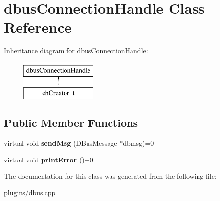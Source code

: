 \hypertarget{classdbusConnectionHandle}{\section{dbus\-Connection\-Handle \-Class \-Reference}
\label{classdbusConnectionHandle}
}
\-Inheritance diagram for dbus\-Connection\-Handle\-:\begin{figure}[H]
\begin{center}
\leavevmode
\includegraphics[height=2.000000cm]{classdbusConnectionHandle}
\end{center}
\end{figure}
\subsection*{\-Public \-Member \-Functions}
\begin{DoxyCompactItemize}
\item 
\hypertarget{classdbusConnectionHandle_af5227c7912ec21c4c4038bfa379c4a6f}{virtual void {\bfseries send\-Msg} (\-D\-Bus\-Message $\ast$dbmsg)=0}\label{classdbusConnectionHandle_af5227c7912ec21c4c4038bfa379c4a6f}

\item 
\hypertarget{classdbusConnectionHandle_a91d40d8dafa19f3ef45c360626725487}{virtual void {\bfseries print\-Error} ()=0}\label{classdbusConnectionHandle_a91d40d8dafa19f3ef45c360626725487}

\end{DoxyCompactItemize}


\-The documentation for this class was generated from the following file\-:\begin{DoxyCompactItemize}
\item 
plugins/dbus.\-cpp\end{DoxyCompactItemize}

